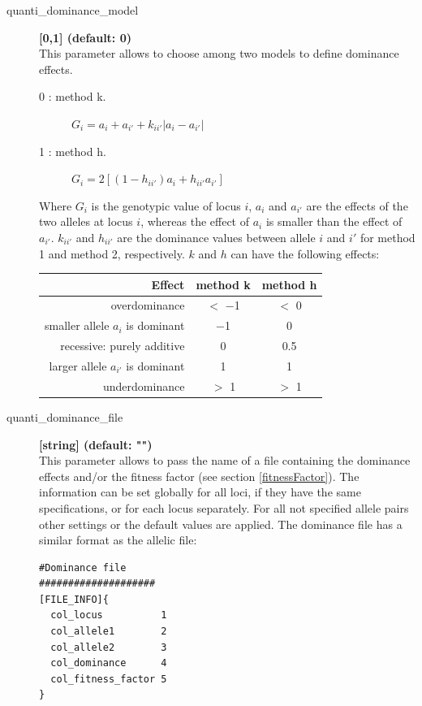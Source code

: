 \documentclass[letterpaper,12pt,oneside]{book}
\begin{document}
\begin{description}
\item [quanti\_dominance\_model] \textbf{[0,1] (default: 0)} \\
This parameter allows to choose among two models to define dominance
effects.
\begin{description}
\item [0 : method k.] $G_{i} = a_{i} + a_{i'} + k_{ii'}|a_{i} - a_{i'}|$
\item [1 : method h.] $G_{i} = 2[(1 - h_{ii'})a_{i} + h_{ii'}a_{i'}]$
\end{description}
Where $G_{i}$ is the genotypic value of locus $i$, $a_{i}$ and $a_{i'}$ are the effects of the two alleles at locus $i$, whereas the effect of $a_{i}$ is smaller than the effect of $a_{i'}$. $k_{ii'}$ and $h_{ii'}$ are the dominance values between allele $i$ and $i'$ for method 1 and method 2, respectively. $k$ and $h$ can have the following effects: \\

\begin{tabular}{rcc}
\hline
Effect 				                     & method k  & method h \\
\hline
overdominance                      & $<$ −1    & $<$ 0    \\
smaller allele $a_{i}$ is dominant & −1        & 0        \\
recessive: purely additive         & 0         & 0.5      \\
larger allele $a_{i'}$ is dominant & 1         & 1        \\
underdominance                     & $>$ 1     & $>$ 1    \\
\hline
\end{tabular}

\item[quanti\_dominance\_file] \textbf{[string] (default: "")}\\
This parameter allows to pass the name of a file containing the dominance effects and/or the fitness factor (see section \ref{fitnessFactor}). The information can be set globally for all loci, if they have the same specifications, or for each locus separately. For all not specified allele pairs other settings or the default values are applied. The dominance file has a similar format as the allelic file:

\begin{lstlisting}[frame=single]
#Dominance file 
####################
[FILE_INFO]{
  col_locus          1
  col_allele1        2
  col_allele2        3
  col_dominance      4
  col_fitness_factor 5
}


\end{lstlisting}
\end{description}
\end{document}
